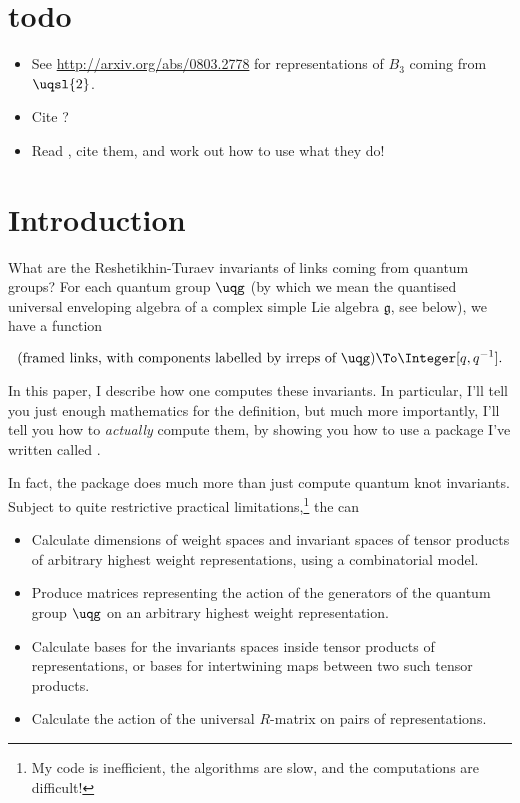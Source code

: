 \section{todo}
\begin{itemize}
\item  See \url{http://arxiv.org/abs/0803.2778} for representations of $B_3$
coming from $\uqsl{2}$.
\item Cite \cite{MR1026957}?
\item Read \cite{MR1099254}, cite them, and work out how to use what they
do!
\end{itemize}

\section{Introduction}
What are the Reshetikhin-Turaev invariants \cite{reshetikhin, MR1025161, MR1036112, MR939474} of links coming
from quantum groups? For each quantum group $\uqg$ (by which we mean the
quantised universal enveloping algebra of a complex simple Lie algebra
$\mathfrak{g}$, see below), we have a function

$$(\text{framed links, with components labelled by irreps of $\uqg$}) \To
\Integer[q,q^{-1}].$$

In this paper, I describe how one computes these invariants. In
particular, I'll tell you just enough mathematics for the definition, but
much more importantly, I'll tell you how to \emph{actually} compute them,
by showing you how to use a \MMA package I've written called
.

In fact, the package does much more than just compute quantum knot
invariants. Subject to quite restrictive practical
limitations,\footnote{My code is inefficient, the algorithms are slow,
and the computations are difficult!} the \pkg can
\begin{itemize}
\item Calculate dimensions of weight spaces and invariant spaces of
tensor products of arbitrary highest weight representations, using a
combinatorial model.
\item Produce matrices representing the action of the generators of the quantum group
$\uqg$ on an arbitrary highest weight representation.
\item Calculate bases for the invariants spaces inside tensor
products of representations, or bases for intertwining maps between two
such tensor products.
\item Calculate the action of the universal $R$-matrix on pairs of
representations.
\end{itemize}

